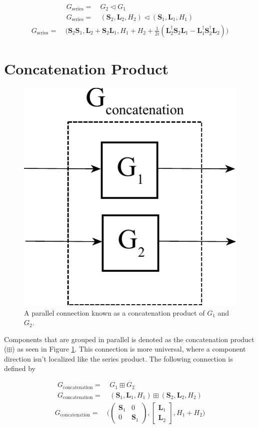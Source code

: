 \documentclass[a4paper]{article}
\begin{document}
\begin{align*}
    G_{\text{series}} = & \ G_2 \triangleleft G_1 \\
    G_{\text{series}} = & \ (\textbf{S}_2,\textbf{L}_2,H_2) \triangleleft (\textbf{S}_1,\textbf{L}_1,H_1)
\end{align*}
\begin{align}
    G_{\text{series}} = & \ \Bigg( \textbf{S}_2\textbf{S}_1,\textbf{L}_2+\textbf{S}_2\textbf{L}_1,H_1 + H_2 + \frac{1}{2i}(\textbf{L}_2^\dagger \textbf{S}_2\textbf{L}_1 - \textbf{L}_1^\dagger \textbf{S}_2^\dagger \textbf{L}_2) \Bigg)
    \label{eq:series}
\end{align}


\section*{Concatenation Product}

\begin{figure}[H]
\centering
\includegraphics[width = 7.5 cm]{Concatenation_product.pdf}
\caption{A parallel connection known as a concatenation product of $G_1$ and $G_2$.
}
\label{fig:concatenation}
\end{figure}  

Components that are grouped in parallel is denoted as the concatenation product ($ \boxplus $) as seen in Figure \ref{fig:concatenation}. This connection is more universal, where a component direction isn't localized like the series product. The following connection is defined by

\begin{align*}
    G_{\text{concatenation}} = & \ G_1 \boxplus G_2 \\
    G_{\text{concatenation}} = & \ (\textbf{S}_1,\textbf{L}_1,H_1) \boxplus (\textbf{S}_2,\textbf{L}_2,H_2)
\end{align*}
\begin{align}
    G_{\text{concatenation}} = & \ \Bigg( \begin{pmatrix} \textbf{S}_1 & 0 \\ 0 & \textbf{S}_1\end{pmatrix},\begin{bmatrix} \textbf{L}_1 \\ \textbf{L}_2 \end{bmatrix},H_1 + H_2 \Bigg)
    \label{eq:concatenation}
\end{align}
\end{document}
